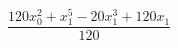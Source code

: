 \documentclass{article}
\begin{document}
\[
\frac{120 x_{0}^{2} + x_{1}^{5} - 20 x_{1}^{3} + 120 x_{1}}{120}
\]
\end{document}
